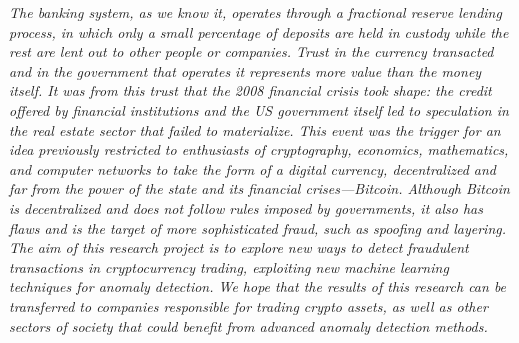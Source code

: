 \emph{The banking system, as we know it, operates through a fractional reserve lending process, in which only a small
percentage of deposits are held in custody while the rest are lent out to other people or companies. Trust in the
currency transacted and in the government that operates it represents more value than the money itself. It was from this
trust that the 2008 financial crisis took shape: the credit offered by financial institutions and the US government
itself led to speculation in the real estate sector that failed to materialize. This event was the trigger for an idea
previously restricted to enthusiasts of cryptography, economics, mathematics, and computer networks to take the form of
a digital currency, decentralized and far from the power of the state and its financial crises—Bitcoin. Although Bitcoin
is decentralized and does not follow rules imposed by governments, it also has flaws and is the target of more
sophisticated fraud, such as spoofing and layering. The aim of this research project is to explore new ways to detect
fraudulent transactions in cryptocurrency trading, exploiting new machine learning techniques for anomaly detection. We
hope that the results of this research can be transferred to companies responsible for trading crypto assets, as well as
other sectors of society that could benefit from advanced anomaly detection methods.}
